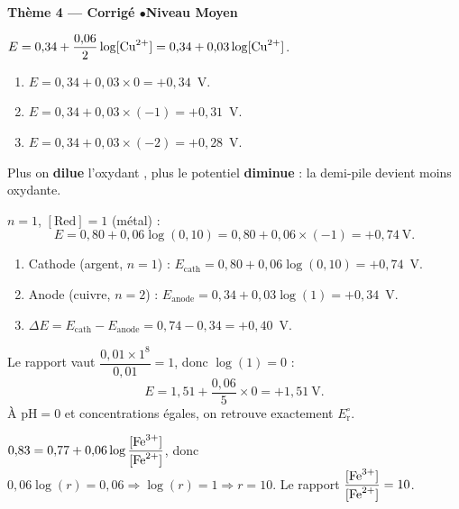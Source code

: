\documentclass[11pt,a4paper]{article}
\begin{document}
\begin{center}\color{primarydark}\large\bfseries Thème 4 — Corrigé \quad$\bullet$\quad Niveau Moyen\end{center}

\begin{corrige}
$E=0{,}34+\dfrac{0{,}06}{2}\log[\ce{Cu^{2+}}]=0{,}34+0{,}03\log[\ce{Cu^{2+}}]$.
\begin{enumerate}[label=\alph*)]
  \item $E=0{,}34+0{,}03\times 0=+0{,}34$~V.
  \item $E=0{,}34+0{,}03\times(-1)=+0{,}31$~V.
  \item $E=0{,}34+0{,}03\times(-2)=+0{,}28$~V.
\end{enumerate}
Plus on \textbf{dilue} l'oxydant , plus le potentiel \textbf{diminue} : la demi-pile
devient moins oxydante.
\end{corrige}

\begin{corrige}
$n=1$, $[\mathrm{Red}]=1$ (métal) :
\[
E=0{,}80+0{,}06\log(0{,}10)=0{,}80+0{,}06\times(-1)=+0{,}74~\text{V}.
\]
\end{corrige}

\begin{corrige}
\begin{enumerate}[label=\alph*)]
  \item Cathode (argent, $n=1$) : $E_{\text{cath}}=0{,}80+0{,}06\log(0{,}10)=+0{,}74$~V.
  \item Anode (cuivre, $n=2$) : $E_{\text{anode}}=0{,}34+0{,}03\log(1)=+0{,}34$~V.
  \item $\Delta E=E_{\text{cath}}-E_{\text{anode}}=0{,}74-0{,}34=+0{,}40$~V.
\end{enumerate}
\end{corrige}

\begin{corrige}
Le rapport vaut $\dfrac{0{,}01\times 1^{8}}{0{,}01}=1$, donc $\log(1)=0$ :
\[
E=1{,}51+\frac{0{,}06}{5}\times 0=+1{,}51~\text{V}.
\]
À $\mathrm{pH}=0$ et concentrations égales, on retrouve exactement $E_{\mathrm{r}}^{\circ}$.
\end{corrige}

\begin{corrige}
$0{,}83=0{,}77+0{,}06\log\dfrac{[\ce{Fe^{3+}}]}{[\ce{Fe^{2+}}]}$, donc
$0{,}06\log(r)=0{,}06\Rightarrow\log(r)=1\Rightarrow r=10$. Le rapport
$\dfrac{[\ce{Fe^{3+}}]}{[\ce{Fe^{2+}}]}=10$.
\end{corrige}
\end{document}
